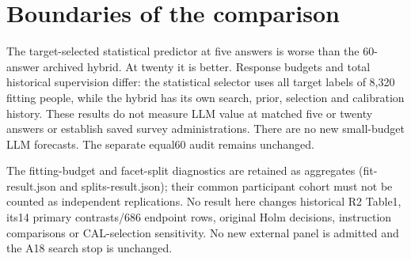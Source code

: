 \documentclass[10pt]{article}
\begin{document}
\section{Boundaries of the comparison}
The target-selected statistical predictor at five answers is worse than the
60-answer archived hybrid. At twenty it is better. Response budgets and total
historical supervision differ: the statistical selector uses all target labels
of 8,320 fitting people, while the hybrid has its own search, prior, selection
and calibration history. These results do not measure LLM value at matched five
or twenty answers or establish saved survey administrations. There are no new
small-budget LLM forecasts. The separate equal60 audit remains unchanged.

The fitting-budget and facet-split diagnostics are retained as aggregates
(fit-result.json and splits-result.json); their common participant cohort must
not be counted as independent replications. No result here changes historical
R2 Table1, its14 primary contrasts/686 endpoint rows, original Holm decisions,
instruction comparisons or CAL-selection sensitivity. No new external panel
is admitted and the A18 search stop is unchanged.
\end{document}
